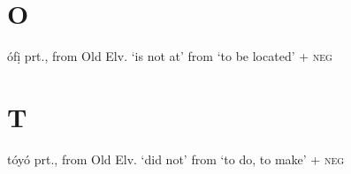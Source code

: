 \begin{multicols*}{2}
\section{O}

\begin{entrylist}
    \begin{dictentry}{ófị}{
        prt., from Old Elv.  `is not at' from  `to be located' +  \textsc{neg}
    }\label{enl:ofi_HL}
    \end{dictentry}
\end{entrylist}

\section{T}

\begin{entrylist}
    \begin{dictentry}{tóyó}{
        prt., from Old Elv.  `did not' from  `to do, to make' +  \textsc{neg}
    }\label{enl:toyo_HH}
    \end{dictentry}
\end{entrylist}

\end{multicols*}
